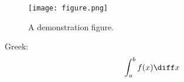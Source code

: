 \begin{figure}[htb!]
    \centering
    \texttt{[image: figure.png]}
    \caption{A demonstration figure.}
    \label{fig:demo}
\end{figure}
Greek: \alpha \beta \gamma
\begin{equation*}
    \int_{a}^{b}  f(x) \diff x
\end{equation*}
